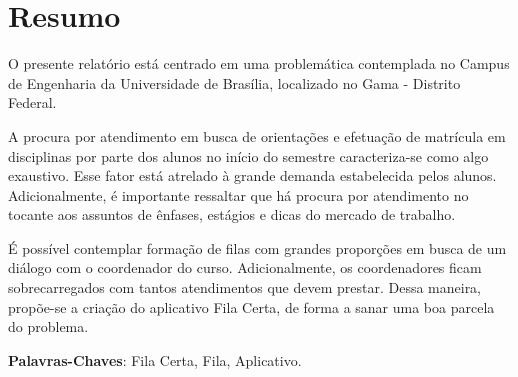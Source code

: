 \chapter[Resumo]{Resumo}
\label{chap:resumo}
	O presente relatório está centrado em uma problemática contemplada no Campus de Engenharia da Universidade de Brasília, localizado no Gama - Distrito Federal.

	A procura por atendimento em busca de orientações e efetuação de matrícula em disciplinas por parte dos alunos no início do semestre caracteriza-se como algo exaustivo. Esse fator está atrelado à grande demanda estabelecida pelos alunos. Adicionalmente, é importante ressaltar que há procura por atendimento no tocante aos assuntos de ênfases, estágios e dicas do mercado de trabalho.

	É possível contemplar formação de filas com grandes proporções em busca de um diálogo com o coordenador do curso. Adicionalmente, os coordenadores ficam sobrecarregados com tantos atendimentos que devem prestar. Dessa maneira, propõe-se a criação do aplicativo Fila Certa, de forma a sanar uma boa parcela do problema.

	\vspace{\onelineskip}
	   
	\noindent
	\textbf{Palavras-Chaves}: Fila Certa, Fila, Aplicativo.

